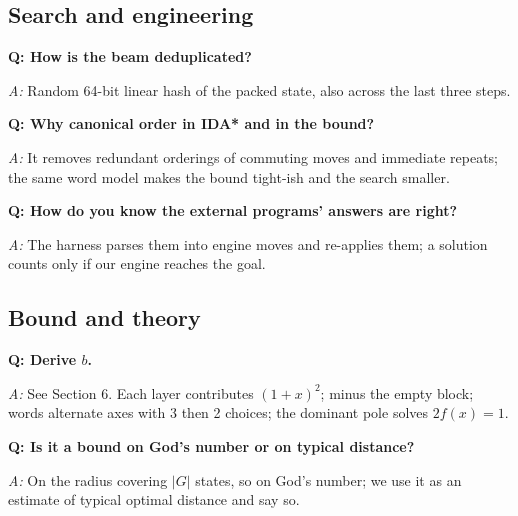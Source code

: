 \documentclass[10.5pt,a4paper]{article}
\newcommand{\Q}[1]{\par\smallskip\textbf{Q: #1}\par}
\newcommand{\A}{\textit{A:} }
\begin{document}
\subsection{Search and engineering}
\Q{How is the beam deduplicated?} \A Random 64-bit linear hash of the packed state, also across the last three steps.
\Q{Why canonical order in IDA* and in the bound?} \A It removes redundant orderings of commuting moves and immediate repeats; the
same word model makes the bound tight-ish and the search smaller.
\Q{How do you know the external programs' answers are right?} \A The harness parses them into engine moves and re-applies them; a
solution counts only if our engine reaches the goal.

\subsection{Bound and theory}
\Q{Derive $b$.} \A See Section 6. Each layer contributes $(1+x)^2$; minus the empty block; words alternate axes with 3 then 2 choices;
the dominant pole solves $2f(x)=1$.
\Q{Is it a bound on God's number or on typical distance?} \A On the radius covering $|G|$ states, so on God's number; we use it as an
estimate of typical optimal distance and say so.

\end{document}
